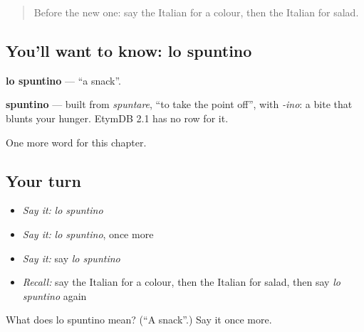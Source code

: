 \label{lesson:IT-C247-spuntino}



\begin{quote}
Before the new one: say the Italian for a colour, then the Italian for salad.
\end{quote}

\subsection*{You'll want to know: lo spuntino}
\textbf{lo spuntino} — \textquotedblleft{}a snack\textquotedblright{}.

\begin{cousinweb}
\textbf{spuntino} — built from \emph{spuntare}, \textquotedblleft{}to take the point off\textquotedblright{}, with \emph{-ino}: a bite that blunts your hunger. EtymDB 2.1 has no row for it.
\end{cousinweb}

\begin{grammarlens}[title={What you've built}]
One more word for this chapter.
\end{grammarlens}

\subsection*{Your turn}
\begin{itemize}
\raggedright
  \item \emph{Say it:} \emph{lo spuntino}
  \item \emph{Say it:} \emph{lo spuntino}, once more
  \item \emph{Say it:} say \emph{lo spuntino}
  \item \emph{Recall:} say the Italian for a colour, then the Italian for salad, then say \emph{lo spuntino} again
\end{itemize}

\begin{tcolorbox}[breakable,colback=teal!4,colframe=teal!35!black,title={Before you move on}]
What does lo spuntino mean? (\textquotedblleft{}A snack\textquotedblright{}.) Say it once more.
\end{tcolorbox}
